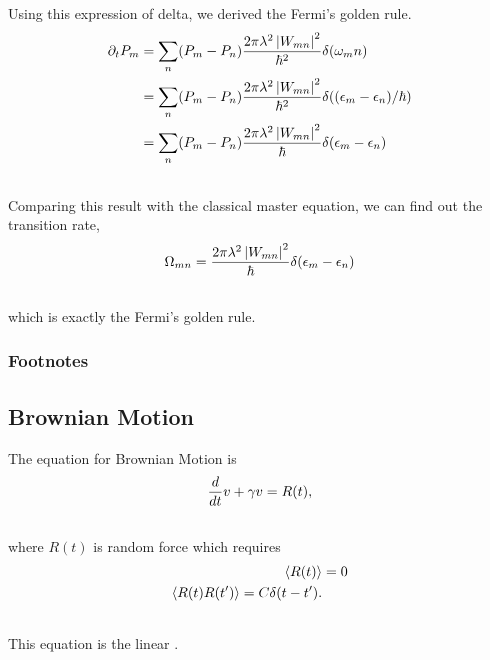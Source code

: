 \documentclass[letterpaper,10pt,english]{sphinxmanual}
\newcommand{\avg}[1]{\left< #1 \right>}
\begin{document}
Using this expression of delta, we derived the Fermi's golden rule.
\begin{gather}
\begin{split}\partial_t P_m & =  \sum_n (P_m - P_n)   \frac{2 \pi \lambda^2 \left| W_{mn}\right|^2 }{\hbar^2}  \delta(\omega_mn)  \\
& =  \sum_n (P_m - P_n)   \frac{2 \pi \lambda^2 \left| W_{mn}\right|^2 }{\hbar^2}  \delta((\epsilon_m - \epsilon_n)/\hbar) \\
& =  \sum_n (P_m - P_n)   \frac{2 \pi \lambda^2 \left| W_{mn}\right|^2 }{\hbar}  \delta(\epsilon_m - \epsilon_n)\end{split}\notag\\\begin{split}\end{split}\notag
\end{gather}
Comparing this result with the classical master equation, we can find out the transition rate,
\begin{gather}
\begin{split}\Omega_{mn} = \frac{2 \pi \lambda^2 \left| W_{mn}\right|^2 }{\hbar}  \delta(\epsilon_m - \epsilon_n)\end{split}\notag\\\begin{split}\end{split}\notag
\end{gather}
which is exactly the Fermi's golden rule.


\subsubsection{Footnotes}
\label{nonequilibrium/quantumMasterEqn:footnotes}

\subsection{Brownian Motion}
\label{nonequilibrium/brownianMotion:brownian-motion}\label{nonequilibrium/brownianMotion::doc}
The equation for Brownian Motion is
\begin{gather}
\begin{split}\frac{d}{dt} v + \gamma v = R(t),\end{split}\notag\\\begin{split}\end{split}\notag
\end{gather}
where $R(t)$ is random force which requires
\begin{gather}
\begin{split}\avg{R(t)} &= 0 \\
\avg{R(t)R(t')} = C \delta(t-t') .\end{split}\notag\\\begin{split}\end{split}\notag
\end{gather}
This equation is the linear .
\end{document}
